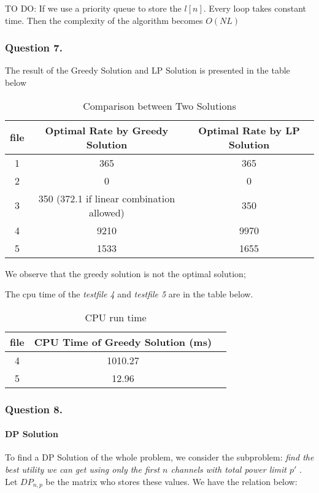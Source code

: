 \documentclass[11pt, oneside]{report}
\begin{document}
TO DO: If we use a priority queue to store the $l[n]$. Every loop takes constant time. Then the complexity of the algorithm becomes $O(N L)$

\subsubsection{Question 7. }
The result of the Greedy Solution and LP Solution is presented in the table below

\begin{table}[!htbp]
\centering
\begin{tabular}{|c|c|c|}%
\hline
file & Optimal Rate by Greedy Solution & Optimal Rate by LP Solution  \\
\hline
1 & 365 & 365\\
\hline
2 & 0 & 0\\
\hline
3 & 350 (372.1 if linear combination allowed) & 350\\
\hline
4 & 9210 & 9970\\
\hline
5 & 1533 & 1655\\
\hline
\end{tabular}
\caption{Comparison between Two Solutions}
\end{table}

We observe that the greedy solution is not the optimal solution;

The cpu time of the \textit{testfile 4} and \textit{testfile 5} are in the table below.

\begin{table}[!htbp]
\centering
\begin{tabular}{|c|c|c|}%
\hline
file & CPU Time of Greedy Solution (ms)  \\
\hline
4 &  1010.27\\
\hline
5 & 12.96\\
\hline
\end{tabular}
\caption{CPU run time}
\end{table}

\subsubsection{Question 8. }
\paragraph{DP Solution} To find a DP Solution of the whole problem, we consider the subproblem: \textit{find the best utility we can get using only the first $n$ channels with total power limit $p'$ }. Let $DP_{n,p}$ be the matrix who stores these values. We have the relation below:
\end{document}
